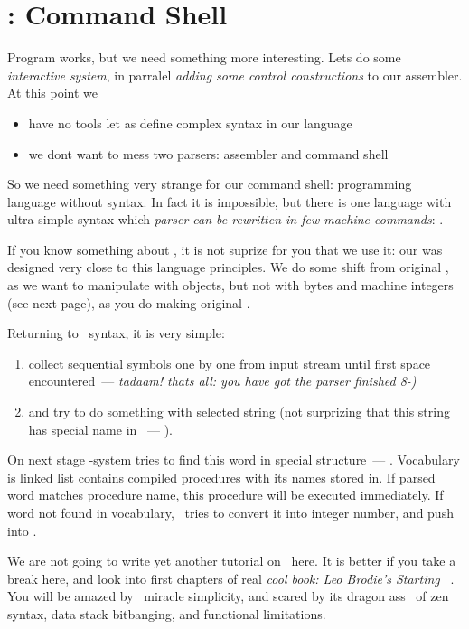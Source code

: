 \section{\F: Command Shell}

Program works, but we need something more interesting. Lets do some
\emph{interactive system}, in parralel \emph{adding some control constructions}
to our assembler. At this point we
\begin{itemize}
	\item have no tools let as define complex syntax in our language
	\item we dont want to mess two parsers: assembler and command shell
\end{itemize}
So we need something very strange for our command shell: programming language
without syntax. In fact it is impossible, but there is one language with ultra
simple syntax which \emph{parser can be rewritten in few machine commands}: \F.

If you know something about \F, it is not suprize for you that we use it: our
was designed very close to this language principles. We do some shift
from original \F, as we want to manipulate with objects, but not with bytes
and machine integers (see next page), as you do making original
.

\bigskip
Returning to \F\ syntax, it is very simple:
\begin{enumerate}[nosep]
\item collect sequential symbols one by one from input stream until first
space encountered\ --- \emph{tadaam! thats all: you have got the parser 
finished 8-)}
\item and try to do something with selected string (not surprizing that this 
string has special name in \F\ --- ).
\end{enumerate}
On next stage \F-system tries to find this word in special structure\ ---
. Vocabulary is linked list contains compiled procedures
with its names stored in.
If parsed word matches procedure name, this procedure will
be executed immediately. If word not found in vocabulary, \F\ tries to convert
it into integer number, and push into .

\bigskip
We are not going to write yet another tutorial on \F\ here. It is better
if you take a break here, and look into first chapters of real \emph{cool book:
Leo Brodie's Starting \F}\ \cite{starting}. You will be amazed by \F\ miracle
simplicity, and scared by its dragon ass \cite{dragon}\ of zen syntax,
data stack bitbanging, and functional limitations.

